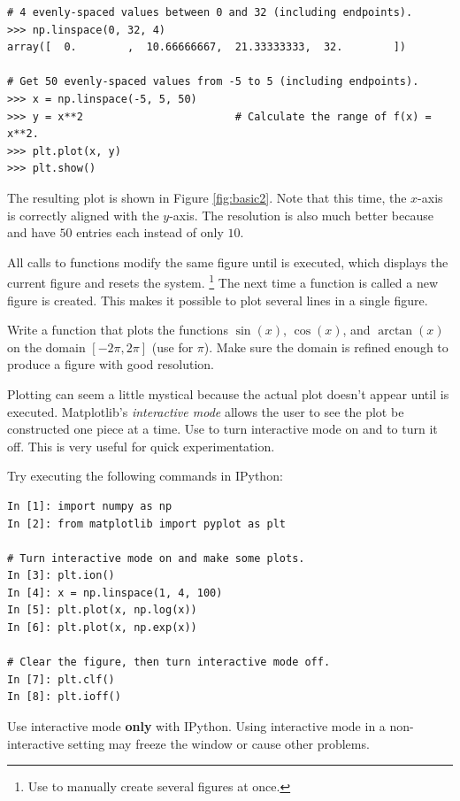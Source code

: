 \begin{lstlisting}
# 4 evenly-spaced values between 0 and 32 (including endpoints).
>>> np.linspace(0, 32, 4)
array([  0.        ,  10.66666667,  21.33333333,  32.        ])

# Get 50 evenly-spaced values from -5 to 5 (including endpoints).
>>> x = np.linspace(-5, 5, 50)
>>> y = x**2                        # Calculate the range of f(x) = x**2.
>>> plt.plot(x, y)
>>> plt.show()
\end{lstlisting}

The resulting plot is shown in Figure \ref{fig:basic2}.
Note that this time, the $x$-axis is correctly aligned with the $y$-axis.
The resolution is also much better because  and  have $50$ entries each instead of only $10$.

All calls to  functions modify the same figure until  is executed, which displays the current figure and resets the system.%
\footnote{Use  to manually create several figures at once.}
The next time a  function is called a new figure is created.
This makes it possible to plot several lines in a single figure.


\begin{problem} %
Write a function that plots the functions $\sin(x)$, $\cos(x)$, and $\arctan(x)$ on the domain $[-2\pi, 2\pi]$ (use  for $\pi$).
Make sure the domain is refined enough to produce a figure with good resolution.
\end{problem}

\begin{info} %
Plotting can seem a little mystical because the actual plot doesn't appear until  is executed.
Matplotlib's \emph{interactive mode} allows the user to see the plot be constructed one piece at a time.
Use  to turn interactive mode on and  to turn it off.
This is very useful for quick experimentation.

Try executing the following commands in IPython:

\begin{lstlisting}
In [1]: import numpy as np
In [2]: from matplotlib import pyplot as plt

# Turn interactive mode on and make some plots.
In [3]: plt.ion()
In [4]: x = np.linspace(1, 4, 100)
In [5]: plt.plot(x, np.log(x))
In [6]: plt.plot(x, np.exp(x))

# Clear the figure, then turn interactive mode off.
In [7]: plt.clf()
In [8]: plt.ioff()
\end{lstlisting}

Use interactive mode \textbf{only} with IPython.
Using interactive mode in a non-interactive setting may freeze the window or cause other problems.
\end{info}

